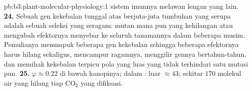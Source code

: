 \begin{solution}{pb:b3:plant-molecular-physiology:1}
sistem imunnya melawan lengan yang lain.
\textbf{24.} Sebuah gen kekebalan tunggal atas berjuta-juta tumbuhan yang serupa
adalah sebuah seleksi yang seragam: mutan mana pun yang kehilangan atau mengubah efektornya
menyebar ke seluruh tanamannya dalam beberapa musim. Pemulianya menumpuk beberapa
gen kekebalan sehingga beberapa efektornya harus hilang sekaligus, mencampur
ragamnya, menggilir gennya bertahun-tahun, dan memihak kekebalan terpicu pola
yang luas yang tidak terhindari satu mutasi pun.
\textbf{25.} $\varphi \approx 0.22$ di bawah kanopinya;  dalam :
luar $\approx 43$; sekitar $170$ molekul air yang hilang tiap CO$_{2}$
yang difiksasi.
\end{solution}
